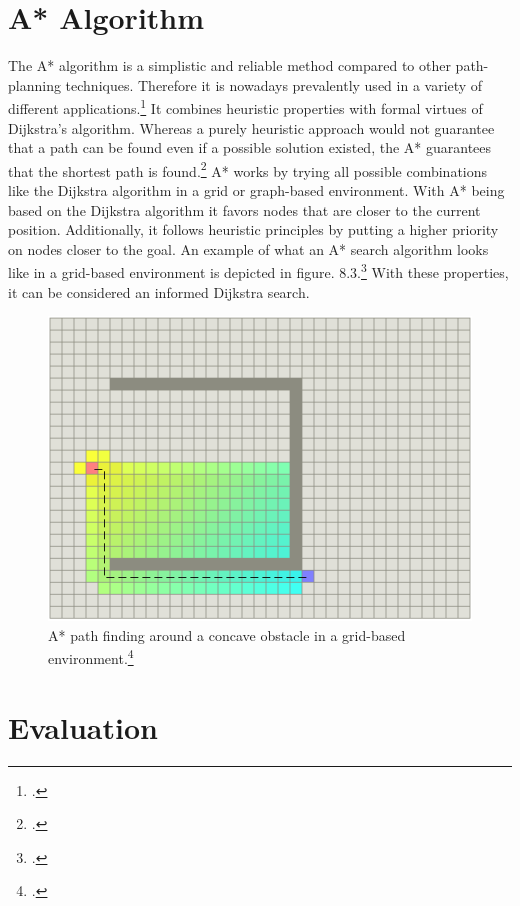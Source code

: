 \section{A* Algorithm}

The A* algorithm is a simplistic and reliable method compared to other path-planning techniques. Therefore it is nowadays prevalently used in a variety of different applications.\footcite{Zammit2018}\newline
It combines heuristic properties with formal virtues of Dijkstra's algorithm. Whereas a purely heuristic approach would not guarantee that a path can be found even if a possible solution existed, the A* guarantees that the shortest path is found.\footcite{Sathyaraj2008}
A* works by trying all possible combinations like the Dijkstra algorithm in a grid or graph-based environment. With A* being based on the Dijkstra algorithm it favors nodes that are closer to the current position. Additionally, it follows heuristic principles by putting a higher priority on nodes closer to the goal. An example of what an A* search algorithm looks like in a grid-based environment is depicted in figure. 8.3.\footcite{standfordAStarComparison1997}\newline
With these properties, it can be considered an informed Dijkstra search.
  
\begin{figure}[h]
	\centering
	\includegraphics[width=0.7\linewidth]{img/AStarExample}
	\caption{A* path finding around a concave obstacle in a grid-based environment.\footcite{standfordAStarComparison1997}}
	\label{fig:path_planning_Astar}
\end{figure}

\section{Evaluation}

